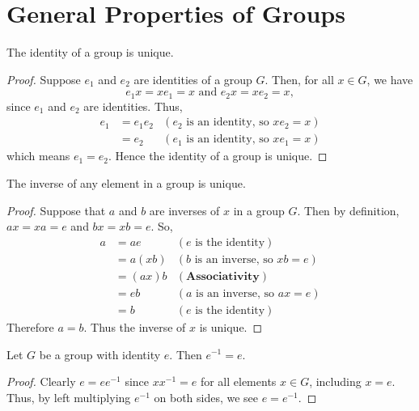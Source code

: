 \section{General Properties of Groups}
\begin{proposition}
    The identity of a group is unique.
\end{proposition}
\begin{proof}
    Suppose $e_1$ and $e_2$ are identities of a group $G$. Then, for all $x \in G$, we have
    \[
        e_1x = xe_1 = x \text{ and } e_2x = xe_2 = x,
    \]
    since $e_1$ and $e_2$ are identities. Thus,
    \begin{align*}
        e_1 &= e_1e_2 & (e_2 \text{ is an identity, so } xe_2 = x)\\
        &= e_2 & (e_1 \text{ is an identity, so } xe_1 = x)
    \end{align*}
    which means $e_1 = e_2$. Hence the identity of a group is unique.
\end{proof}

\begin{proposition}
    The inverse of any element in a group is unique.
\end{proposition}
\begin{proof}
    Suppose that $a$ and $b$ are inverses of $x$ in a group $G$. Then by definition, $ax = xa = e$ and $bx = xb = e$. So,
    \begin{align*}
        a &= ae & (e \text{ is the identity})\\
        &= a(xb) & (b \text{ is an inverse, so } xb = e)\\
        &= (ax)b & (\textbf{Associativity})\\
        &= eb & (a \text{ is an inverse, so } ax = e)\\
        &= b & (e \text{ is the identity})
    \end{align*}
    Therefore $a = b$. Thus the inverse of $x$ is unique.
\end{proof}

\begin{proposition}\label{prop-inverse-of-identity-is-identity}
    Let $G$ be a group with identity $e$. Then $e^{-1} = e$.
\end{proposition}
\begin{proof}
    Clearly $e = ee^{-1}$ since $xx^{-1} = e$ for all elements $x \in G$, including $x = e$. Thus, by left multiplying $e^{-1}$ on both sides, we see $e = e^{-1}$.
\end{proof}

